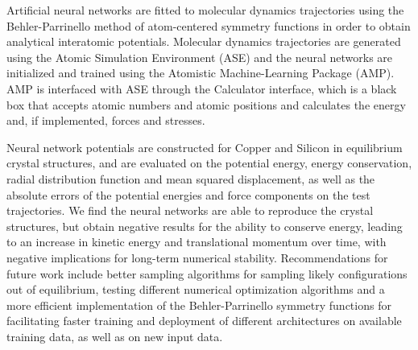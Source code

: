Artificial neural networks are fitted to molecular dynamics trajectories
using the Behler-Parrinello method of atom-centered symmetry functions
in order to obtain analytical interatomic potentials.
Molecular dynamics trajectories are generated using the Atomic Simulation
Environment (ASE) and the neural networks are initialized and trained
using the Atomistic Machine-Learning Package (AMP). AMP is interfaced
with ASE through the Calculator interface, which is a black box
that accepts atomic numbers and atomic positions and calculates
the energy and, if implemented, forces and stresses.
\par
Neural network potentials are constructed for Copper and Silicon
in equilibrium crystal structures, and are evaluated on the potential energy,
energy conservation, radial distribution function and mean
squared displacement, as well as the absolute errors of the
potential energies and force components on the test trajectories.
We find the neural networks are able to reproduce the crystal structures,
but obtain negative results for the ability to conserve energy,
leading to an increase in kinetic energy and translational momentum
over time, with negative implications for long-term numerical stability.
Recommendations for future work include better sampling
algorithms for sampling likely configurations out of equilibrium,
testing different numerical optimization algorithms
and a more efficient implementation of the Behler-Parrinello
symmetry functions for facilitating faster training and deployment
of different architectures on available training data, as well as
on new input data.
